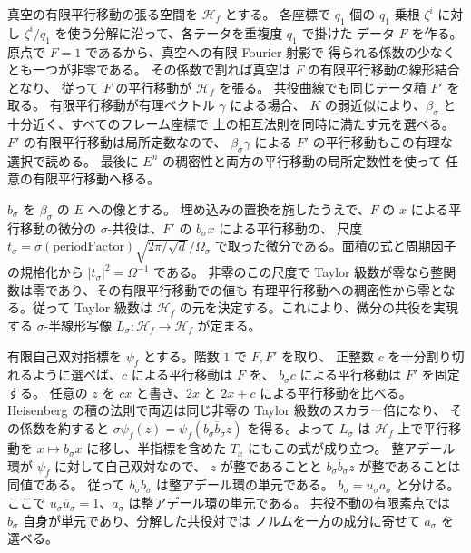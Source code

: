 真空の有限平行移動の張る空間を \(\mathscr H_f\) とする。
各座標で \(q_1\) 個の \(q_1\) 乗根 \(\zeta^i\) に対し
\(\zeta^i/q_1\) を使う分解に沿って、各テータを重複度 \(q_1\) で掛けた
データ \(F\) を作る。原点で \(F=1\) であるから、真空への有限 Fourier 射影で
得られる係数の少なくとも一つが非零である。
その係数で割れば真空は \(F\) の有限平行移動の線形結合となり、
従って \(F\) の平行移動が \(\mathscr H_f\) を張る。
共役曲線でも同じテータ積 \(F'\) を取る。
有限平行移動が有理ベクトル \(\gamma\) による場合、
\(K\) の弱近似により、\(\beta_\sigma\) と十分近く、すべてのフレーム座標で
上の相互法則を同時に満たす元を選べる。\(F'\) の有限平行移動は局所定数なので、
\(\beta_\sigma\gamma\) による \(F'\) の平行移動もこの有理な選択で読める。
最後に \(E^n\) の稠密性と両方の平行移動の局所定数性を使って
任意の有限平行移動へ移る。

\(b_\sigma\) を \(\beta_\sigma\) の \(E\) への像とする。
埋め込みの置換を施したうえで、\(F\) の \(x\) による平行移動の微分の
\(\sigma\)-共役は、\(F'\) の \(b_\sigma x\) による平行移動の、
尺度 \(t_\sigma=\sigma(\mathrm{periodFactor})\sqrt{2\pi/\sqrt d}/\Omega_\sigma\)
で取った微分である。面積の式と周期因子の規格化から
\(|t_\sigma|^2=\Omega^{-1}\) である。
非零のこの尺度で Taylor 級数が零なら整関数は零であり、その有限平行移動での値も
有理平行移動への稠密性から零となる。従って Taylor 級数は
\(\mathscr H_f\) の元を決定する。これにより、微分の共役を実現する
\(\sigma\)-半線形写像 \(L_\sigma:\mathscr H_f\to\mathscr H_f\) が定まる。

有限自己双対指標を \(\psi_f\) とする。階数 \(1\) で \(F,F'\) を取り、
正整数 \(c\) を十分割り切れるように選べば、\(c\) による平行移動は \(F\) を、
\(b_\sigma c\) による平行移動は \(F'\) を固定する。
任意の \(z\) を \(cx\) と書き、\(2x\) と \(2x+c\) による平行移動を比べる。
Heisenberg の積の法則で両辺は同じ非零の Taylor 級数のスカラー倍になり、
その係数を約すると \(\sigma\psi_f(z)=\psi_f(b_\sigma\overline b_\sigma z)\)
を得る。よって \(L_\sigma\) は \(\mathscr H_f\) 上で平行移動を
\(x\mapsto b_\sigma x\) に移し、半指標を含めた \(T_x\) にもこの式が成り立つ。
整アデール環が \(\psi_f\) に対して自己双対なので、
\(z\) が整であることと \(b_\sigma\overline b_\sigma z\) が整であることは同値である。
従って \(b_\sigma\overline b_\sigma\) は整アデール環の単元である。
\(b_\sigma=u_\sigma a_\sigma\) と分ける。ここで
\(u_\sigma\overline u_\sigma=1\)、\(a_\sigma\) は整アデール環の単元である。
共役不動の有限素点では \(b_\sigma\) 自身が単元であり、分解した共役対では
ノルムを一方の成分に寄せて \(a_\sigma\) を選べる。

